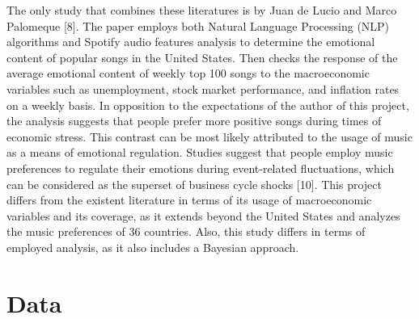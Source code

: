 \documentclass[12pt]{article}
\begin{document}
The only study that combines these literatures is by Juan de Lucio and Marco Palomeque [8]. The paper employs both Natural Language Processing (NLP) algorithms and Spotify audio features analysis to determine the emotional content of popular songs in the United States. Then checks the response of the average emotional content of weekly top 100 songs to the macroeconomic variables such as unemployment, stock market performance, and inflation rates on a weekly basis. In opposition to the expectations of the author of this project, the analysis suggests that people prefer more positive songs during times of economic stress. This contrast can be most likely attributed to the usage of music as a means of emotional regulation. Studies suggest that people employ music preferences to regulate their emotions during event-related fluctuations, which can be considered as the superset of business cycle shocks [10]. This project differs from the existent literature in terms of its usage of macroeconomic variables and its coverage, as it extends beyond the United States and analyzes the music preferences of 36 countries. Also, this study differs in terms of employed analysis, as it also includes a Bayesian approach.

\section{Data}
\end{document}
